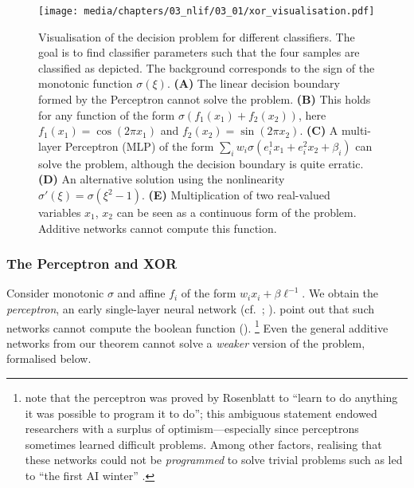 \begin{figure}
	\centering
	\texttt{[image: media/chapters/03\_nlif/03\_01/xor\_visualisation.pdf]}%
	{\label{fig:xor_visualisation_a}}%
	{\label{fig:xor_visualisation_b}}%
	{\label{fig:xor_visualisation_c}}%
	{\label{fig:xor_visualisation_d}}%
	{\label{fig:xor_visualisation_e}}%
	\caption[Visualisation of the XOR decision problem for different classifiers]{Visualisation of the \XOR decision problem for different classifiers. The goal is to find classifier parameters such that the four samples are classified as depicted.
	The background corresponds to the sign of the monotonic function $\sigma(\xi)$.
	\textbf{(A)} The linear decision boundary formed by the Perceptron cannot solve the \XOR problem.
	\textbf{(B)} This holds for any function of the form $\sigma(f_1(x_1) + f_2(x_2))$, here $f_1(x_1) = \cos(2\pi x_1)$ and $f_2(x_2) = \sin(2\pi x_2)$.
	\textbf{(C)} A multi-layer Perceptron (MLP) of the form $\sum_i w_i \sigma(e_i^1 x_1 + e_i^2 x_2 + \beta_i )$ can solve the problem, although the decision boundary is quite erratic.
	\textbf{(D)} An alternative solution using the nonlinearity $\sigma'(\xi) = \sigma(\xi^2 - 1)$.
	\textbf{(E)} Multiplication of two real-valued variables $x_1$, $x_2$ can be seen as a continuous form of the \XOR problem.
	Additive networks cannot compute this function.
	}
	\label{fig:xor_visualisation}
\end{figure}

\subsubsection{The Perceptron and XOR}
Consider monotonic $\sigma$ and affine $f_i$ of the form $w_i x_i + \beta \ell^{-1}$.
We obtain the \emph{perceptron}, an early single-layer neural network (cf.~; \cite{rosenblatt1958perceptron}).
 point out that such networks cannot compute the boolean \XOR function ().%
\footnote{ note that the perceptron was proved by Rosenblatt to \enquote{learn to do anything it was possible to program it to do}; this ambiguous statement endowed researchers with a surplus of optimism---especially since perceptrons sometimes learned difficult problems.
Among other factors, realising that these networks could not be \emph{programmed} to solve trivial problems such as \XOR led to \enquote{the first AI winter} \citep[e.g.,][]{muthukrishnan2020brief}.}
Even the general additive networks from our theorem cannot solve a \emph{weaker} version of the \XOR problem, formalised below.

